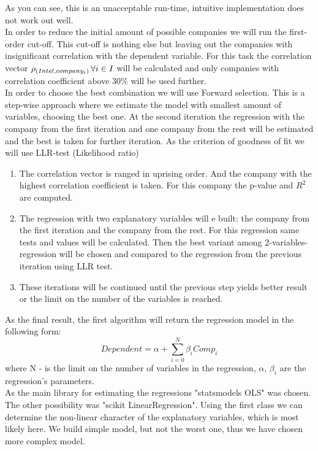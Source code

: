 \documentclass[12pt, a4paper]{article}
\begin{document}
As you can see, this is an unacceptable run-time, intuitive implementation does not work out well.\\
In order to reduce the initial amount of possible companies we will run the first-order cut-off. This cut-off is nothing else but leaving out the companies with insignificant correlation with the dependent variable. For this task the correlation vector $\rho_{(Intel, company_{i})} \thinspace \forall i\in I$ will be calculated and only companies with correlation coefficient above 30\% will be used further.\\ 
In order to choose the best combination we will use Forward selection. This is a step-wise approach where we estimate the model with smallest amount of variables, choosing the best one. At the second iteration the regression with the company from the first iteration and one company from the rest will be estimated and the best is taken for further iteration. As the criterion of goodness of fit we will use LLR-test (Likelihood ratio)
\begin{enumerate}
	\item The correlation vector is ranged in uprising order. And the company with the highest correlation coefficient is taken. For this company the p-value and $R^2$ are computed.
	\item The regression with two explanatory variables will e built: the company from the first iteration and the company from the rest. For this regression same tests and values will be calculated. Then the best variant among 2-variables-regression will be chosen and compared to the regression from the previous iteration using LLR test.
	\item These iterations will be continued until the previous step yields better result or the limit on the number of the variables is reached. 
\end{enumerate} 
As the final result, the first algorithm will return the regression model in the following form: 
\[Dependent = \alpha + \sum_{i=0}^{N} \beta_{i}Comp_{i}\] 
where N - is the limit on the number of variables in the regression, $\alpha$, $\beta_{i}$ are the regression's parameters.
\\
As the main library for estimating the regressions "statsmodels OLS" was chosen. The other possibility was "scikit LinearRegression". Using the first class we can determine the non-linear character of the explanatory variables, which is most likely here. We build simple model, but not the worst one, thus we have chosen more complex model.
\end{document}
